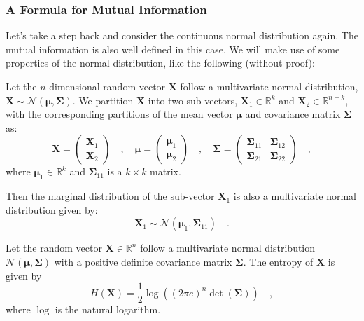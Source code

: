 \documentclass[../../main.tex]{subfiles}
\begin{document}
\subsubsection{A Formula for Mutual Information}
Let's take a step back and consider the continuous normal distribution again. The mutual information is also well defined in this case. We will make use of some properties of the normal distribution, like the following (without proof):

\pagebreak
\begin{proposition}
    \label{proposition:marginal_distributions_of_a_normal_distribution}
    Let the $n$-dimensional random vector $\bm{X}$ follow a multivariate normal distribution, $\bm{X} \sim \mathcal{N}(\bm{\mu}, \bm{\Sigma})$. We partition $\bm{X}$ into two sub-vectors, $\bm{X}_1 \in \mathbb{R}^k$ and $\bm{X}_2 \in \mathbb{R}^{n-k}$, with the corresponding partitions of the mean vector $\bm{\mu}$ and covariance matrix $\bm{\Sigma}$ as:
    \[
        \bm{X} = \begin{pmatrix} \bm{X}_1 \\ \bm{X}_2 \end{pmatrix} \quad , \quad 
        \bm{\mu} = \begin{pmatrix} \bm{\mu}_1 \\ \bm{\mu}_2 \end{pmatrix} \quad , \quad 
        \bm{\Sigma} = \begin{pmatrix} \bm{\Sigma}_{11} & \bm{\Sigma}_{12} \\ \bm{\Sigma}_{21} & \bm{\Sigma}_{22} \end{pmatrix} \quad ,
    \]
    where $\bm{\mu}_1 \in \mathbb{R}^k$ and $\bm{\Sigma}_{11}$ is a $k \times k$ matrix.
    
    Then the marginal distribution of the sub-vector $\bm{X}_1$ is also a multivariate normal distribution given by:
    \[
        \bm{X}_1 \sim \mathcal{N}(\bm{\mu}_1, \bm{\Sigma}_{11}) \quad .
    \]
\end{proposition}

\begin{proposition}
    Let the random vector $\bm{X} \in \mathbb{R}^n$ follow a multivariate normal distribution $\mathcal{N}(\bm{\mu}, \bm{\Sigma})$ with a positive definite covariance matrix $\bm{\Sigma}$. The entropy of $\bm{X}$ is given by
    \[
        H(\bm{X}) = \frac{1}{2} \log\left( (2\pi e)^n \det(\bm{\Sigma}) \right) \quad,
    \]
    where $\log$ is the natural logarithm.
\end{proposition}
\end{document}
